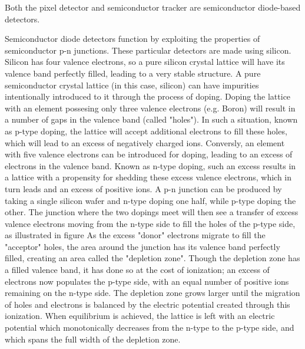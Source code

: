         Both the pixel detector and semiconductor tracker are semiconductor diode-based detectors.

        Semiconductor diode detectors function by exploiting the properties of semiconductor p-n junctions.
        These particular detectors are made using silicon.
        Silicon has four valence electrons, so a pure silicon crystal lattice will have its valence band perfectly filled, leading to a very stable structure.
        A pure semiconductor crystal lattice (in this case, silicon) can have impurities intentionally introduced to it through the process of doping.
        Doping the lattice with an element possesing only three valence electrons (e.g. Boron) will result in a number of gaps in the valence band (called "holes").
        In such a situation, known as p-type doping, the lattice will accept additional electrons to fill these holes, which will lead to an excess of negatively charged ions.
        Conversly, an element with five valence electrons can be introduced for doping, leading to an excess of electrons in the valence band.
        Known as n-type doping, such an excess results in a lattice with a propensity for shedding these excess valence electrons, which in turn leads and an excess of positive ions.
        A p-n junction can be produced by taking a single silicon wafer and n-type doping one half, while p-type doping the other.
        The junction where the two dopings meet will then see a transfer of excess valence electrons moving from the n-type side to fill the holes of the p-type side, as illustrated in figure %
        As the excess "donor" electrons migrate to fill the "acceptor" holes, the area around the junction has its valence band perfectly filled, creating an area called the "depletion zone".
        Though the depletion zone has a filled valence band, it has done so at the cost of ionization; an excess of electrons now populates the p-type side, with an equal number of positive ions remaining on the n-type side.
        The depletion zone grows larger until the migration of holes and electrons is balanced by the electric potential created through this ionization.
        When equilibrium is achieved, the lattice is left with an electric potential which monotonically decreases from the n-type to the p-type side, and which spans the full width of the depletion zone. %
